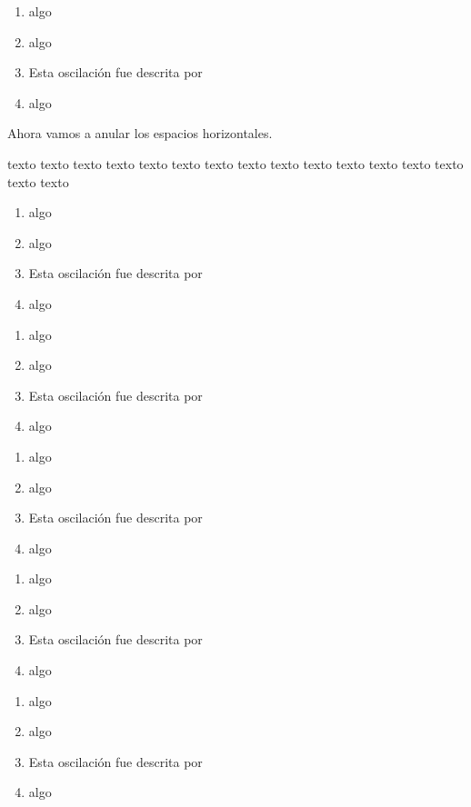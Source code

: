 \documentclass{report}
\theoremstyle{remark}%
\begin{document}
\begin{enumerate}[topsep=12cm,partopsep=0pt,parsep=0pt,itemsep=0pt]%
	\item algo
	\item algo
	\item Esta oscilación fue descrita por 
	\item algo
\end{enumerate}%

Ahora vamos a anular los espacios horizontales.


\noindent texto texto texto texto texto texto texto texto texto texto texto texto texto texto texto texto 

\begin{enumerate}[leftmargin=*]%
	\item algo
	\item algo
	\item Esta oscilación fue descrita por 
	\item algo
\end{enumerate}

\begin{enumerate}[labelsep=*]%
	\item algo
	\item algo
	\item Esta oscilación fue descrita por 
	\item algo
\end{enumerate}

\begin{enumerate}[label=\Roman*))]%
\item algo
\item algo
\item Esta oscilación fue descrita por 
\item algo
\end{enumerate}

\begin{enumerate}[label=\alph*)]
	\item algo
	\item algo
	\item Esta oscilación fue descrita por 
	\item algo
\end{enumerate}

\begin{enumerate}[label=\arabic*]%
	\item algo
	\item algo
	\item Esta oscilación fue descrita por 
	\item algo
\end{enumerate}
\end{document}
